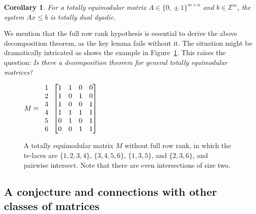 \documentclass[11pt,a4paper]{amsart}
\renewcommand*{\leq}{\leqslant}
\theoremstyle{plain}
\newtheorem{corollary}[theorem]{Corollary}
\theoremstyle{definition}
\begin{document}
\begin{corollary}
	For a totally equimodular matrix $A\in\{0,\!\pm1\}^{m\times n}$ and $b\in\mathbb{Z}^m$, the system $Ax\leq b$ is totally dual
	dyadic.
\end{corollary}

We mention that the full row rank hypothesis is essential to derive the above decomposition theorem, as the key lemma fails without it.
The situation might be dramatically intricated as shows the example in Figure~\ref{ctrex}.
This raises the question:
\textit{Is there a decomposition theorem for general totally equimodular matrices?}
\begin{figure}[ht]
	\centering
	${ M=
		\begin{tabular}{c}
			1\\
			2\\
			3\\
			4\\
			5\\
			6				
		\end{tabular}
		\begin{bmatrix}
			1 & 1 & 0 & 0\\
			1 & 0 & 1 & 0\\
			1 & 0 & 0 & 1\\
			1 & 1 & 1 & 1\\
			0 & 1 & 0 & 1\\
			0 & 0 & 1 & 1
		\end{bmatrix}
	}
	$
	\caption{A totally equimodular matrix $M$ without full row rank, in which the te-laces are  $\{1,2,3,4\}$, $\{3,4,5,6\}$, $\{1,3,5\}$, and $\{2,3,6\}$, and pairwise intersect. Note that there are even intersections of size two.}\label{ctrex}
\end{figure}

\subsection{A conjecture and connections with other classes of matrices}
\end{document}
